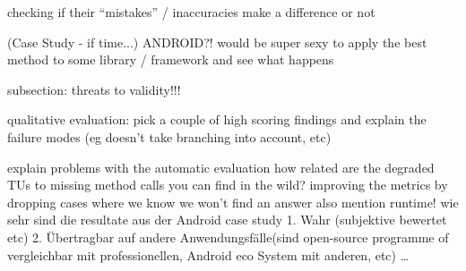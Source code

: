 checking if their ``mistakes'' / inaccuracies make a difference or not

(Case Study - if time...)
    ANDROID?!
    would be super sexy to apply the best method to some library / framework and see what happens

subsection: threats to validity!!!

qualitative evaluation:
    pick a couple of high scoring findings and explain the failure modes (eg doesn't take branching into account, etc)

explain problems with the automatic evaluation
    how related are the degraded TUs to missing method calls you can find in the wild?
    improving the metrics by dropping cases where we know we won't find an answer
    also mention runtime!
    wie sehr sind die resultate aus der Android case study 1. Wahr (subjektive bewertet etc) 2. Übertragbar auf andere Anwendungsfälle(sind open-source programme of vergleichbar mit professionellen, Android eco System mit anderen, etc)
    \ldots
